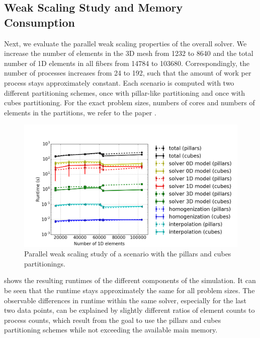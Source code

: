 \subsection{Weak Scaling Study and Memory Consumption}\label{sec:opencmiss_memory}

Next, we evaluate the parallel weak scaling properties of the overall solver. We increase the number of elements in the 3D mesh from 1232 to 8640 and the total number of 1D elements in all fibers from \num{14784} to \num{103680}. Correspondingly, the number of processes increases from 24 to 192, such that the amount of work per process stays approximately constant. Each scenario is computed with two different partitioning schemes, once with pillar-like partitioning and once with cubes partitioning. For the exact problem sizes, numbers of cores and numbers of elements in the partitions, we refer to the paper \cite{Bradley:2018:EDB}. 

\begin{figure}
  \centering%
  \includegraphics[width=\textwidth]{images/results/studies/opencmiss_weak_scaling.png}%
  \caption{Parallel weak scaling study of a scenario with the pillars and cubes partitionings.}%
  \label{fig:opencmiss_weak_scaling}%
\end{figure}

 shows the resulting runtimes of the different components of the simulation. It can be seen that the runtime stays approximately the same for all problem sizes. The observable differences in runtime within the same solver, especially for the last two data points, can be explained by slightly different ratios of element counts to process counts, which result from the goal to use the pillars and cubes partitioning schemes while not exceeding the available main memory.

